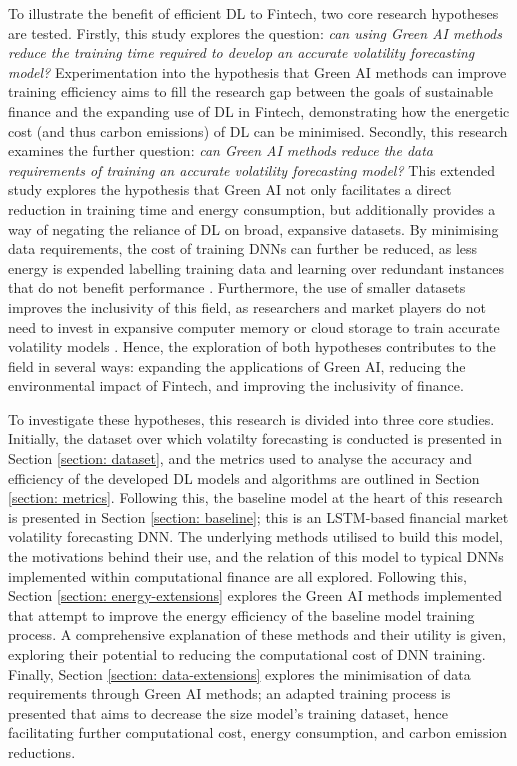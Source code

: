 \documentclass[a4paper, 11pt]{report}
\begin{document}
    To illustrate the benefit of efficient DL to Fintech, two core research hypotheses are tested. Firstly, this study explores the question: \emph{can using Green AI methods reduce the training time required to develop an accurate volatility forecasting model?} Experimentation into the hypothesis that Green AI methods can improve training efficiency aims to fill the research gap between the goals of sustainable finance and the expanding use of DL in Fintech, demonstrating how the energetic cost (and thus carbon emissions) of DL can be minimised. Secondly, this research examines the further question: \emph{can Green AI methods reduce the data requirements of training an accurate volatility forecasting model?} This extended study explores the hypothesis that Green AI not only facilitates a direct reduction in training time and energy consumption, but additionally provides a way of negating the reliance of DL on broad, expansive datasets. By minimising data requirements, the cost of training DNNs can further be reduced, as less energy is expended labelling training data and learning over redundant instances that do not benefit performance \citep{schwartz-2019}. Furthermore, the use of smaller datasets improves the inclusivity of this field, as researchers and market players do not need to invest in expansive computer memory or cloud storage to train accurate volatility models \citep{strubell-2019}. Hence, the exploration of both hypotheses contributes to the field in several ways: expanding the applications of Green AI, reducing the environmental impact of Fintech, and improving the inclusivity of finance.

    To investigate these hypotheses, this research is divided into three core studies. Initially, the dataset over which volatilty forecasting is conducted is presented in Section \ref{section: dataset}, and the metrics used to analyse the accuracy and efficiency of the developed DL models and algorithms are outlined in Section \ref{section: metrics}. Following this, the baseline model at the heart of this research is presented in Section \ref{section: baseline}; this is an LSTM-based financial market volatility forecasting DNN. The underlying methods utilised to build this model, the motivations behind their use, and the relation of this model to typical DNNs implemented within computational finance are all explored. Following this, Section \ref{section: energy-extensions} explores the Green AI methods implemented that attempt to improve the energy efficiency of the baseline model training process. A comprehensive explanation of these methods and their utility is given, exploring their potential to reducing the computational cost of DNN training. Finally, Section \ref{section: data-extensions} explores the minimisation of data requirements through Green AI methods; an adapted training process is presented that aims to decrease the size model's training dataset, hence facilitating further computational cost, energy consumption, and carbon emission reductions.
\end{document}
